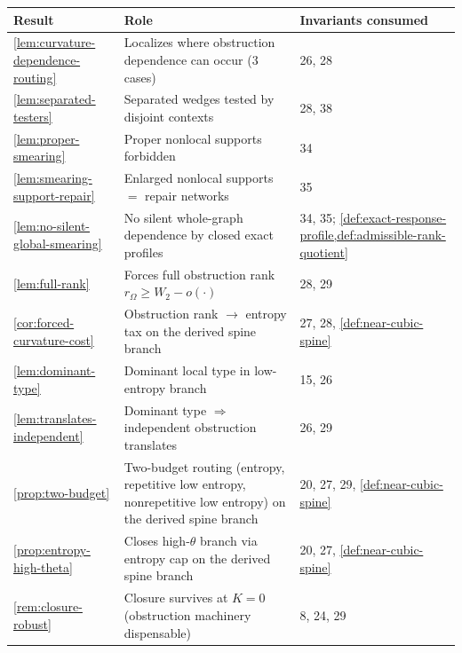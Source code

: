 \documentclass[11pt]{article}
\begin{document}
{\small
\begin{longtable}{L{0.31\textwidth} L{0.42\textwidth} L{0.17\textwidth}}
\toprule
\textbf{Result} & \textbf{Role} & \textbf{Invariants consumed} \\
\midrule
\endhead
\cref{lem:curvature-dependence-routing} & Localizes where obstruction dependence can occur (3 cases) & 26, 28 \\
\cref{lem:separated-testers} & Separated wedges tested by disjoint contexts & 28, 38 \\
\cref{lem:proper-smearing} & Proper nonlocal supports forbidden & 34 \\
\cref{lem:smearing-support-repair} & Enlarged nonlocal supports $=$ repair networks & 35 \\
\cref{lem:no-silent-global-smearing} & No silent whole-graph dependence by closed exact profiles & 34, 35; \cref{def:exact-response-profile,def:admissible-rank-quotient} \\
\cref{lem:full-rank} & Forces full obstruction rank $r_\Omega\ge W_2-o(\cdot)$ & 28, 29 \\
\cref{cor:forced-curvature-cost} & Obstruction rank $\to$ entropy tax on the derived spine branch & 27, 28, \cref{def:near-cubic-spine} \\
\cref{lem:dominant-type} & Dominant local type in low-entropy branch & 15, 26 \\
\cref{lem:translates-independent} & Dominant type $\Rightarrow$ independent obstruction translates & 26, 29 \\
\cref{prop:two-budget} & Two-budget routing (entropy, repetitive low entropy, nonrepetitive low entropy) on the derived spine branch & 20, 27, 29, \cref{def:near-cubic-spine} \\
\cref{prop:entropy-high-theta} & Closes high-$\theta$ branch via entropy cap on the derived spine branch & 20, 27, \cref{def:near-cubic-spine} \\
\cref{rem:closure-robust} & Closure survives at $K=0$ (obstruction machinery dispensable) & 8, 24, 29 \\
\bottomrule
\end{longtable}
}
\end{document}

